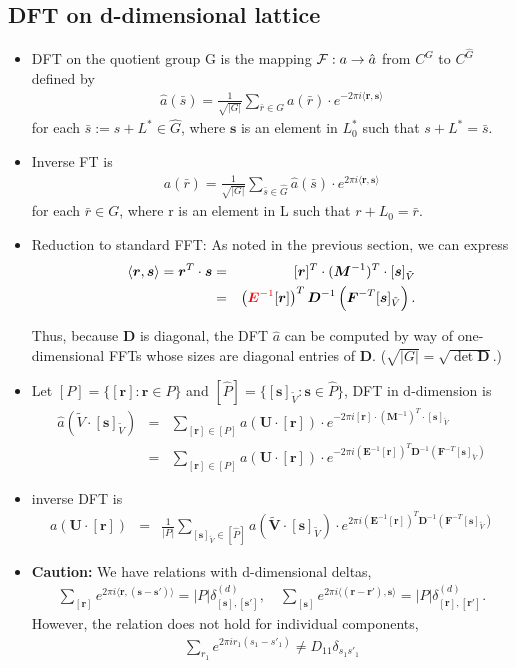 \documentclass[10pt]{book}
\def\bm{\boldsymbol}
\newcommand{\bea}{\begin{eqnarray}}
\newcommand{\eea}{\end{eqnarray}}
\newcommand{\no}{\nonumber \\}
\def\vr{{\bm r}}
\def\la{\langle}
\def\ra{\rangle}
\begin{document}
\subsection{DFT on d-dimensional lattice}
\begin{itemize} 
\item DFT on the quotient group G is the mapping ${\cal F}:a\to \hat{a}$ from $C^G$ to $C^{\hat{G}}$
defined by 
\bea 
\hat{a}(\bar{s})=\frac{1}{\sqrt{|G|}}\sum_{\bar{r}\in G} a(\bar{r})\cdot e^{-2\pi i \la {\bm r},{\bm s}\ra} 
\eea 
for each $\bar{s}:=s+L^*\in \hat{G}$, where ${\bm s}$ is an element in $L_0^*$ such that $s+L^*=\bar{s}$.

\item Inverse FT is
\bea 
a(\bar{r})=\frac{1}{\sqrt{|G|}}\sum_{\bar{s}\in \hat{G}}\hat{a}(\bar{s})\cdot 
e^{2\pi i \la {\bm r},{\bm s}\ra }
\eea 
for each $\bar{r}\in G$, where r is an element in L such that $r+L_0=\bar{r}$.

\item Reduction to standard FFT: As noted in the previous section, we can express 
\bea 
\la {\bm r},{\bm s}\ra ={\bm r}^T\cdot{\bm s}
&=&[{\bm r}]^T\cdot({\bm M}^{-1})^T\cdot[{\bm s}]_{\tilde V} \no 
&=& \left( {\color{red} {\bm E}^{-1}}[{\bm r}]\right)^T  {\bm D}^{-1} \left( {\bm F}^{-T}[{\bm s}]_{\tilde V} \right). 
\eea 

Thus, because ${\bm D}$ is diagonal, 
the DFT $\hat{a}$ can be computed by way of one-dimensional FFTs whose sizes are diagonal entries of ${\bm D}$.
($\sqrt{|G|}=\sqrt{\det{\bm D}}$.)

\item Let $[P]=\{[{\bm r}] :{\bm r}\in P\}$ and $[\hat{P}]=\{[{\bm s}]_{\tilde V} :{\bm s}\in \hat{P}\}$,
DFT in d-dimension is 
\bea 
\hat{a}(\tilde{V}\cdot[{\bm s}]_{\tilde V})
&=& \sum_{[{\bm r}]\in [P]} a({\bm U}\cdot[{\bm r}])\cdot 
e^{-2\pi i [{\bm r}]\cdot ({\bm M}^{-1})^T\cdot[{\bm s}]_{\tilde V}} \no 
&=& \sum_{[{\bm r}]\in [P]} a({\bm U}\cdot[{\bm r}])\cdot 
e^{-2\pi i \left( {\bm E}^{-1}[{\bm r}]\right)^T  {\bm D}^{-1} \left( {\bm F}^{-T}[{\bm s}]_{\tilde V} \right) }
\eea 

\item inverse DFT is 
\bea 
{a}({\bm U}\cdot[{\bm r}])
&=& \frac{1}{|P|}\sum_{[{\bm s}]_{\tilde V}\in [\hat{P}]} a(\tilde{\bm V}\cdot[{\bm s}]_{\tilde{V}}  )\cdot 
e^{2\pi i \left( {\bm E}^{-1}[{\bm r}]\right)^T  {\bm D}^{-1} \left( {\bm F}^{-T}[{\bm s}]_{\tilde V} \right) }
\eea 

\item {\bf Caution:} We have relations with d-dimensional deltas,
\bea 
\sum_{[\vr]} e^{2\pi i\la \vr,
	({\bm s}-{\bm s}')\ra} =|P| \delta^{(d)}_{[{\bm s}],[{\bm s}']}, \quad 
\sum_{[{\bm s}]} e^{2\pi i\la (\vr-\vr'),
	{\bm s}\ra} =|P| \delta^{(d)}_{[{\bm r}],[{\bm r}']}.
\eea 
However, the relation does not hold for individual components, 
\bea 
\sum_{r_1} e^{2\pi i r_1 (s_1-s'_1)}\neq D_{11}\delta_{s_1 s'_1}
\eea 
 
\end{itemize} 
\end{document}
